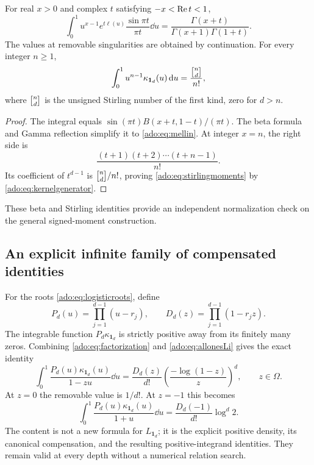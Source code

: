 \begin{proposition}
\label{ado:prop:mellin}
For real $x>0$ and complex $t$ satisfying $-x<\operatorname{Re} t<1$,
\begin{equation}\label{ado:eq:mellin}
 \int_0^1u^{x-1}e^{t\ell(u)}\frac{\sin\pi t}{\pi t}\dd u
 =\frac{\Gamma(x+t)}{\Gamma(x+1)\Gamma(1+t)}.
\end{equation}
The values at removable singularities are obtained by continuation.
For every integer $n\ge1$,
\begin{equation}\label{ado:eq:stirlingmoments}
 \int_0^1u^{n-1}\kappa_{\boldsymbol{1}_d}(u)\dd u
 =\frac{\stirling{n}{d}}{n!},
\end{equation}
where $\stirling{n}{d}$ is the unsigned Stirling number of the first kind,
zero for $d>n$.
\end{proposition}
\begin{proof}
The integral equals
$\sin(\pi t)B(x+t,1-t)/(\pi t)$. The beta formula and Gamma
reflection simplify it to \eqref{ado:eq:mellin}. At integer $x=n$,
the right side is
\[
 \frac{(t+1)(t+2)\cdots(t+n-1)}{n!}.
\]
Its coefficient of $t^{d-1}$ is $\stirling{n}{d}/n!$, proving
\eqref{ado:eq:stirlingmoments} by \eqref{ado:eq:kernelgenerator}.
\end{proof}
These beta and Stirling identities provide an independent normalization
check on the general signed-moment construction.

\subsection{An explicit infinite family of compensated identities}
For the roots \eqref{ado:eq:logisticroots}, define
\[
 P_d(u)=\prod_{j=1}^{d-1}(u-r_j),\qquad
 D_d(z)=\prod_{j=1}^{d-1}(1-r_jz).
\]
The integrable function $P_d\kappa_{\boldsymbol{1}_d}$ is strictly positive
away from its finitely many zeros. Combining
\eqref{ado:eq:factorization} and \eqref{ado:eq:allonesLi} gives the
exact identity
\begin{equation}\label{ado:eq:generalidentity}
 \boxed{\quad
 \int_0^1\frac{P_d(u)\kappa_{\boldsymbol{1}_d}(u)}{1-zu}\dd u
 =\frac{D_d(z)}{d!}
       \left(\frac{-\log(1-z)}z\right)^d,
 \qquad z\in\Omega.
 \quad}
\end{equation}
At $z=0$ the removable value is $1/d!$. At $z=-1$ this becomes
\begin{equation}\label{ado:eq:negativeoneidentity}
 \int_0^1\frac{P_d(u)\kappa_{\boldsymbol{1}_d}(u)}{1+u}\dd u
 =\frac{D_d(-1)}{d!}\log^d2.
\end{equation}
The content is not a new formula for $L_{\boldsymbol{1}_d}$; it is the explicit
positive density, its canonical compensation, and the resulting
positive-integrand identities. They remain valid at every depth without
a numerical relation search.

